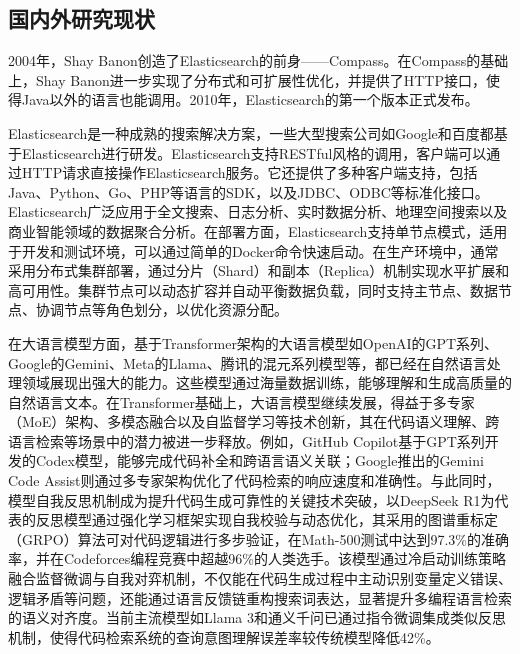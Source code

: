 \documentclass[UTF8,a4paper,12pt]{ctexart}
\numberwithin{equation}{section}
\begin{document}
\subsection{国内外研究现状}
2004年，Shay Banon创造了Elasticsearch的前身——Compass。在Compass的基础上，Shay Banon进一步实现了分布式和可扩展性优化，并提供了HTTP接口，使得Java以外的语言也能调用。2010年，Elasticsearch的第一个版本正式发布。\par
Elasticsearch是一种成熟的搜索解决方案，一些大型搜索公司如Google和百度都基于Elasticsearch进行研发。Elasticsearch支持RESTful风格的调用，客户端可以通过HTTP请求直接操作Elasticsearch服务。它还提供了多种客户端支持，包括Java、Python、Go、PHP等语言的SDK，以及JDBC、ODBC等标准化接口。Elasticsearch广泛应用于全文搜索、日志分析、实时数据分析、地理空间搜索以及商业智能领域的数据聚合分析。在部署方面，Elasticsearch支持单节点模式，适用于开发和测试环境，可以通过简单的Docker命令快速启动。在生产环境中，通常采用分布式集群部署，通过分片（Shard）和副本（Replica）机制实现水平扩展和高可用性。集群节点可以动态扩容并自动平衡数据负载，同时支持主节点、数据节点、协调节点等角色划分，以优化资源分配。\par
在大语言模型方面，基于Transformer架构的大语言模型如OpenAI的GPT系列、Google的Gemini、Meta的Llama、腾讯的混元系列模型等，都已经在自然语言处理领域展现出强大的能力。这些模型通过海量数据训练，能够理解和生成高质量的自然语言文本。在Transformer基础上，大语言模型继续发展，得益于多专家（MoE）架构、多模态融合以及自监督学习等技术创新，其在代码语义理解、跨语言检索等场景中的潜力被进一步释放。例如，GitHub Copilot基于GPT系列开发的Codex模型，能够完成代码补全和跨语言语义关联；Google推出的Gemini Code Assist则通过多专家架构优化了代码检索的响应速度和准确性。与此同时，模型自我反思机制成为提升代码生成可靠性的关键技术突破，以DeepSeek R1为代表的反思模型通过强化学习框架实现自我校验与动态优化，其采用的图谱重标定（GRPO）算法可对代码逻辑进行多步验证，在Math-500测试中达到97.3\%的准确率，并在Codeforces编程竞赛中超越96\%的人类选手。该模型通过冷启动训练策略融合监督微调与自我对弈机制，不仅能在代码生成过程中主动识别变量定义错误、逻辑矛盾等问题，还能通过语言反馈链重构搜索词表达，显著提升多编程语言检索的语义对齐度。当前主流模型如Llama 3和通义千问已通过指令微调集成类似反思机制，使得代码检索系统的查询意图理解误差率较传统模型降低42\%。\par
\end{document}
